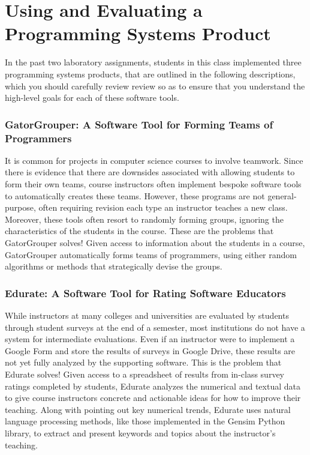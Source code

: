 \documentclass[11pt]{article}
\begin{document}
\section*{Using and Evaluating a Programming Systems Product}

In the past two laboratory assignments, students in this class implemented three programming systems products, that are
outlined in the following descriptions, which you should carefully review review so as to ensure that you understand the
high-level goals for each of these software tools.

\subsubsection*{GatorGrouper: A Software Tool for Forming Teams of Programmers}

It is common for projects in computer science courses to involve teamwork. Since there is evidence that there are
downsides associated with allowing students to form their own teams, course instructors often implement bespoke software
tools to automatically creates these teams. However, these programs are not general-purpose, often requiring revision each
type an instructor teaches a new class. Moreover, these tools often resort to randomly forming groups, ignoring the
characteristics of the students in the course. These are the problems that GatorGrouper solves! Given access to
information about the students in a course, GatorGrouper automatically forms teams of programmers, using either random
algorithms or methods that strategically devise the groups.

\subsubsection*{Edurate: A Software Tool for Rating Software Educators}

While instructors at many colleges and universities are evaluated by students through student surveys at the end of a
semester, most institutions do not have a system for intermediate evaluations. Even if an instructor were to implement a
Google Form and store the results of surveys in Google Drive, these results are not yet fully analyzed by the supporting
software. This is the problem that Edurate solves! Given access to a spreadsheet of results from in-class survey ratings
completed by students, Edurate analyzes the numerical and textual data to give course instructors concrete and
actionable ideas for how to improve their teaching. Along with pointing out key numerical trends, Edurate uses natural
language processing methods, like those implemented in the Gensim Python library, to extract and present keywords and
topics about the instructor's teaching.
\end{document}
